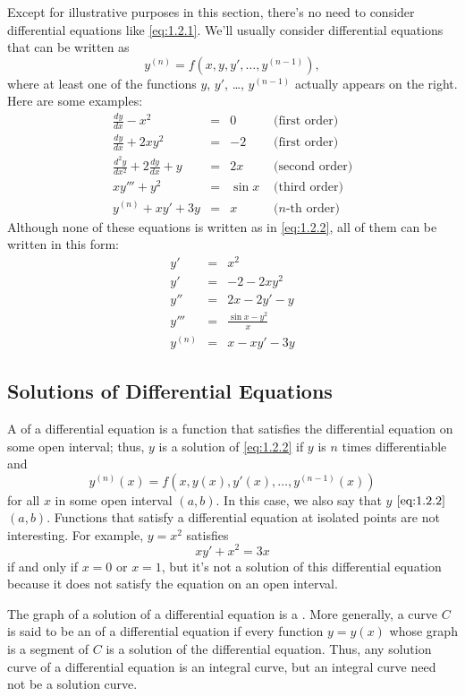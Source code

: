 \documentclass{ximera}
\begin{document}
Except for illustrative purposes in this section, there's no need to
consider differential equations like \eqref{eq:1.2.1}.  We'll
usually consider differential equations that can be written as
\begin{equation} \label{eq:1.2.2}
y^{(n)}=f(x,y,y', \dots,y^{(n-1)}),
\end{equation}
where at least one of the functions $y$, $y'$, \dots, $y^{(n-1)}$ actually
appears on the right. Here are some examples:
$$
\begin{array}{rcll}
\frac{dy}{dx}-x^2&=&0&\mbox{ (first order)}  \\
\frac{dy}{dx}+2xy^2&=&-2&\mbox{ (first order)}   \\
\frac{d^2y}{dx^2}+2\frac{dy}{dx}+y&=&2x&\mbox{ (second order)}
\\
xy'''+y^2&=&\sin x  &\mbox{ (third order)}
\\
y^{(n)}+xy'+3y&=&x&\mbox{ ($n$-th order)}
\end{array}
$$
Although none of these equations is  written as in
\eqref{eq:1.2.2}, all of them can be written in this form:
$$
\begin{array}{rcl}
y'&=&x^2  \\
y'&=&-2-2xy^2   \\
y''&=&2x-2y'-y  \\
y'''&=&\frac{\sin x-y^2}{x}
\\ y^{(n)}&=&x-xy'-3y
\end{array}
$$
 
\subsection*{Solutions of Differential Equations}
 
A  of a differential equation is a function that
satisfies the differential equation on some open interval;   thus, $y$
is a solution of \eqref{eq:1.2.2} if $y$ is $n$ times differentiable and
$$
y^{(n)}(x)=f(x,y(x),y'(x), \dots,y^{(n-1)}(x))
$$
for all $x$ in some open interval $(a,b)$. In this case, we also say
that $y$  $\eqref{eq:1.2.2}$  $(a,b)$. Functions
that satisfy a differential equation at isolated points are not
interesting. For example, $y=x^2$ satisfies
$$
xy'+x^2=3x
$$
if and only if $x=0$ or $x=1$, but it's not a solution of this
differential equation because it does not satisfy the equation on an
open interval.
 
The graph of a solution of a differential equation is  a . More generally, a curve $C$ is said to be an  of a differential equation if every function
$y=y(x)$ whose graph is a segment of $C$ is a solution of the
differential equation. Thus, any solution curve of a differential
equation is an integral curve, but an integral curve need not be a
solution curve.
 
\end{document}
